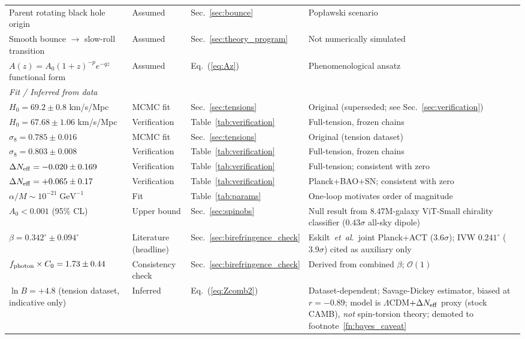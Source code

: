 \documentclass[aps,prd,twocolumn,superscriptaddress,showpacs,preprintnumbers,nofootinbib,longbibliography,floatfix]{revtex4-2}
\newcommand{\Neff}{N_{\rm eff}}
\newcommand{\etal}{\textit{et~al.}}
\begin{document}
\begin{table}[t]
\begin{ruledtabular}
\begin{tabular}{llll}
Parent rotating black hole origin & Assumed & Sec.~\ref{sec:bounce} & Pop\l{}awski scenario \\
Smooth bounce $\to$ slow-roll transition & Assumed & Sec.~\ref{sec:theory_program} & Not numerically simulated \\
$A(z) = A_0(1+z)^{-p}e^{-qz}$ functional form & Assumed & Eq.~(\ref{eq:Az}) & Phenomenological ansatz \\
\hline
\multicolumn{4}{l}{\textit{Fit / Inferred from data}} \\
$H_0 = 69.2 \pm 0.8$ km/s/Mpc & MCMC fit & Sec.~\ref{sec:tensions} & Original (superseded; see Sec.~\ref{sec:verification}) \\
$H_0 = 67.68 \pm 1.06$ km/s/Mpc & Verification & Table~\ref{tab:verification} & Full-tension, frozen chains \\
$\sigma_8 = 0.785 \pm 0.016$ & MCMC fit & Sec.~\ref{sec:tensions} & Original (tension dataset) \\
$\sigma_8 = 0.803 \pm 0.008$ & Verification & Table~\ref{tab:verification} & Full-tension, frozen chains \\
$\Delta\Neff = -0.020 \pm 0.169$ & Verification & Table~\ref{tab:verification} & Full-tension; consistent with zero \\
$\Delta\Neff = +0.065 \pm 0.17$ & Verification & Table~\ref{tab:verification} & Planck+BAO+SN; consistent with zero \\
$\alpha/M \sim 10^{-21}\;\text{GeV}^{-1}$ & Fit & Table~\ref{tab:params} & One-loop motivates order of magnitude \\
$A_0 < 0.001$ (95\% CL) & Upper bound & Sec.~\ref{sec:spinobs} & Null result from $8.47$M-galaxy ViT-Small chirality classifier ($0.43\sigma$ all-sky dipole) \\
$\beta = 0.342^\circ \pm 0.094^\circ$ & Literature (headline) & Sec.~\ref{sec:birefringence_check} & Eskilt~\etal\ joint Planck+ACT ($3.6\sigma$); IVW $0.241^\circ$ ($3.9\sigma$) cited as auxiliary only \\
$f_{\rm photon} \times C_0 = 1.73 \pm 0.44$ & Consistency check & Sec.~\ref{sec:birefringence_check} & Derived from combined $\beta$; $\mathcal{O}(1)$ \\
$\ln B = +4.8$ (tension dataset, indicative only) & Inferred & Eq.~(\ref{eq:Zcomb2}) & Dataset-dependent; Savage-Dickey estimator, biased at $r=-0.89$; model is $\Lambda$CDM$+\Delta\Neff$ proxy (stock CAMB), \emph{not} spin-torsion theory; demoted to footnote~\ref{fn:bayes_caveat} \\
\end{tabular}
\end{ruledtabular}
\end{table}



\end{document}
